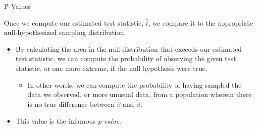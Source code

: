 \documentclass[10pt]{beamer}\usepackage[]{graphicx}\usepackage[]{color}
\begin{document}
\begin{frame}{P-Values}

  Once we compute our estimated test statistic, $\hat{t}$, we compare it to the
  appropriate null-hypothesized sampling distribution.
  \vb
  \begin{itemize}
    \item By calculating the area in the null distribution that exceeds our
      estimated test statistic, we can compute the probability of observing the
      given test statistic, or one more extreme, if the null hypothesis were
      true.  
      \vb
      \begin{itemize}
      \item In other words, we can compute the probability of having sampled the
        data we observed, or more unusual data, from a population wherein there
        is no true difference between $\hat{\beta}$ and $\tilde{\beta}$.
      \end{itemize}
      \vb
    \item This value is the infamous \emph{p-value}.
  \end{itemize}
  
\end{frame}

\watermarkoff %
\end{document}
